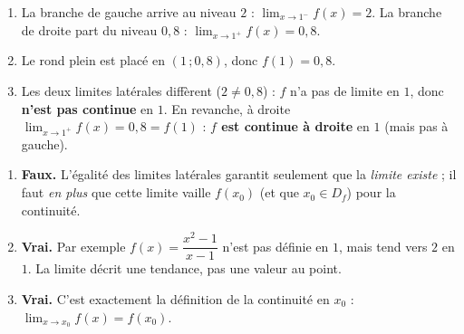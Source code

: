 \documentclass[11pt,a4paper]{article}
\begin{document}
\begin{correction}
\begin{enumerate}[label=\alph*),leftmargin=2em,itemsep=3pt]
  \item La branche de gauche arrive au niveau $2$ : $\displaystyle\lim_{x\to 1^{-}} f(x)=2$.
        La branche de droite part du niveau $0{,}8$ : $\displaystyle\lim_{x\to 1^{+}} f(x)=0{,}8$.
  \item Le rond plein est placé en $(1\,;0{,}8)$, donc $f(1)=0{,}8$.
  \item Les deux limites latérales diffèrent ($2\neq 0{,}8$) : $f$ n'a pas de limite en $1$, donc
        \textbf{n'est pas continue} en $1$. En revanche, à droite $\displaystyle\lim_{x\to 1^{+}} f(x)=0{,}8=f(1)$ :
        \textbf{$f$ est continue à droite} en $1$ (mais pas à gauche).
\end{enumerate}
\end{correction}

\begin{correction}
\begin{enumerate}[label=\alph*),leftmargin=2em,itemsep=3pt]
  \item \textbf{Faux.} L'égalité des limites latérales garantit seulement que la \emph{limite existe} ; il faut
        \emph{en plus} que cette limite vaille $f(x_0)$ (et que $x_0\in D_f$) pour la continuité.
  \item \textbf{Vrai.} Par exemple $f(x)=\dfrac{x^2-1}{x-1}$ n'est pas définie en $1$, mais tend vers $2$ en $1$.
        La limite décrit une tendance, pas une valeur au point.
  \item \textbf{Vrai.} C'est exactement la définition de la continuité en $x_0$ :
        $\displaystyle\lim_{x\to x_0} f(x)=f(x_0)$.
\end{enumerate}
\end{correction}
\end{document}
